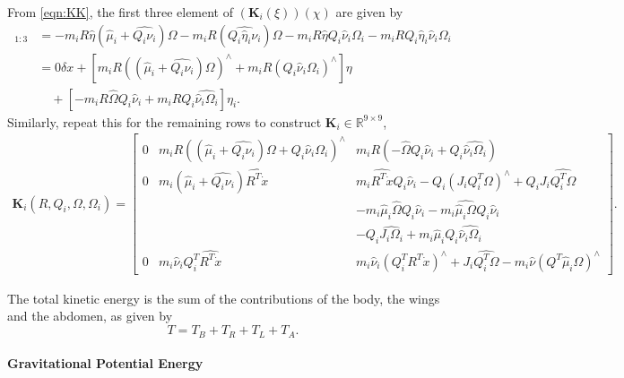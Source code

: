 \documentclass[10pt]{article}
\renewcommand{\Re}{\ensuremath{\mathbb{R}}}
\begin{document}
From \eqref{eqn:KK}, the first three element of $(\mathbf{K}_i(\xi)) (\chi)$ are given by
\begin{align*}
    [ (\mathbf{K}_i(\xi)) (\chi) ]_{1:3} & = 
     - m_i R\hat\eta (\hat\mu_i + \widehat{Q_i\nu_i}) \Omega 
     - m_i R( \widehat{Q_i\hat\eta_i\nu_i}) \Omega
     - m_i R\hat\eta Q_i \hat\nu_i\Omega_i
     - m_i R Q_i\hat\eta_i \hat\nu_i\Omega_i\\
                                         & = 0 \delta x +  [m_i R ((\hat\mu_i + \widehat{Q_i\nu_i}) \Omega)^\wedge + m_i R (Q_i\hat\nu_i\Omega_i)^\wedge ] \eta \\
                                         & \quad +
                                         [   - m_i R\hat\Omega Q_i\hat\nu_i
                                        + m_i R Q_i \widehat{\hat\nu_i \Omega_i} ] \eta_i.
\end{align*}
Similarly, repeat this for the remaining rows to construct 
$\mathbf{K}_i\in\Re^{9\times 9}$,
\begin{align}
    \mathbf{K}_i(R,Q_i,\Omega,\Omega_i) = 
    \begin{bmatrix}
        0 & m_i R ((\hat\mu_i+\widehat{Q_i\nu_i})\Omega + Q_i\hat\nu_i\Omega_i)^\wedge 
          & m_i R( -\hat\Omega Q_i \hat\nu_i + Q_i \widehat{\hat \nu_i \Omega_i}) \\
        0 & m_i(\hat\mu_i + \widehat{Q_i\nu_i})\widehat{R^T \dot x}
        & m_i\widehat{R^T\dot x}Q_i\hat\nu_i - Q_i (J_iQ_i^T\Omega)^\wedge + Q_i J_i \widehat{Q_i^T\Omega} \\
        & & - m_i\hat\mu_i\hat\Omega Q_i\hat\nu_i - m_i\widehat{\hat\mu_i\Omega} Q_i \hat\nu_i \\
        & & - Q_i \widehat{J_i\Omega_i} + m_i \hat\mu_i Q_i \widehat{\hat\nu_i \Omega_i} \\
        0 & m_i \hat\nu_i Q_i^T \widehat{R^T\dot x}
        & m_i \hat\nu_i (Q_i^T R^T \dot x)^\wedge + J_i\widehat{Q_i^T\Omega} - m_i\hat\nu (Q^T\hat\mu_i \Omega)^\wedge
    \end{bmatrix}.
\end{align}


The total kinetic energy is the sum of the contributions of the body, the wings and the abdomen, as given by
\[
    T = T_B + T_R + T_L + T_A.
\]

\paragraph{Gravitational Potential Energy}
\end{document}
